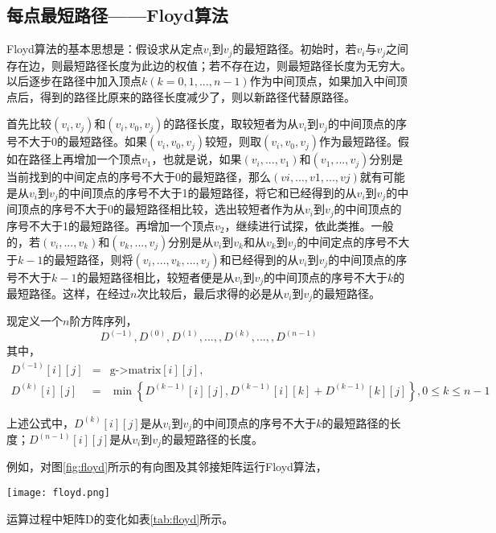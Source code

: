 \subsection{每点最短路径——Floyd算法}
Floyd算法的基本思想是：假设求从定点$v_i$到$v_j$的最短路径。初始时，若$v_i$与$v_j$之间存在边，则最短路径长度为此边的权值；若不存在边，则最短路径长度为无穷大。以后逐步在路径中加入顶点$k(k=0,1,...,n-1)$作为中间顶点，如果加入中间顶点后，得到的路径比原来的路径长度减少了，则以新路径代替原路径。

首先比较$(v_i,v_j)$和$(v_i,v_0,v_j)$的路径长度，取较短者为从$v_i$到$v_j$的中间顶点的序号不大于0的最短路径。如果$(v_i,v_0,v_j)$较短，则取$(v_i,v_0,v_j)$作为最短路径。假如在路径上再增加一个顶点$v_1$，也就是说，如果$(v_i,...,v_1)$和$(v_1,...,v_j)$分别是当前找到的中间定点的序号不大于0的最短路径，那么$(vi,...,v1,...,vj)$就有可能是从$v_i$到$v_j$的中间顶点的序号不大于1的最短路径，将它和已经得到的从$v_i$到$v_j$的中间顶点的序号不大于0的最短路径相比较，选出较短者作为从$v_i$到$v_j$的中间顶点的序号不大于1的最短路径。再增加一个顶点$v_2$，继续进行试探，依此类推。一般的，若$(v_i,...,v_k)$和$(v_k,...,v_j)$分别是从$v_i$到$v_k$和从$v_k$到$v_j$的中间定点的序号不大于$k-1$的最短路径，则将$(v_i,...,v_k,...,v_j)$和已经得到的从$v_i$到$v_j$的中间顶点的序号不大于$k-1$的最短路径相比，较短者便是从$v_i$到$v_j$的中间顶点的序号不大于$k$的最短路径。这样，在经过$n$次比较后，最后求得的必是从$v_i$到$v_j$的最短路径。

现定义一个$n$阶方阵序列，
$$
D^{(-1)}, D^{(0)} , D^{(1)},..., , D^{(k)},..., , D^{(n-1)}
$$
其中，
\begin{eqnarray}
D^{(-1)}[i][j] &=& \text{g->matrix}[i][j],  \nonumber \\
D^{(k)}[i][j] &=& \min\left\{D^{(k-1)}[i][j], D^{(k-1)}[i][k] + D^{(k-1)}[k][j]\right\},0 \leq k \leq n-1 \nonumber
\end{eqnarray}

上述公式中，$D^{(k)}[i][j]$是从$v_i$到$v_j$的中间顶点的序号不大于$k$的最短路径的长度；$D^{(n-1)}[i][j]$是从$v_i$到$v_j$的最短路径的长度。

例如，对图\ref{fig:floyd}所示的有向图及其邻接矩阵运行Floyd算法，

\begin{center}
\texttt{[image: floyd.png]}\\
\label{fig:floyd}
\end{center}

运算过程中矩阵D的变化如表\ref{tab:floyd}所示。

